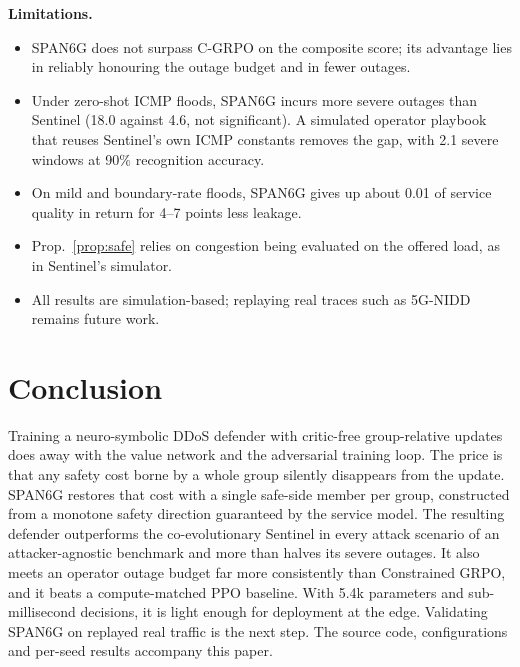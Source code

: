\documentclass[conference]{IEEEtran}
\begin{document}
\textbf{Limitations.}
\begin{itemize}
\item SPAN6G does not surpass C-GRPO on the composite score; its advantage lies in reliably honouring the outage budget and in fewer outages.
\item Under zero-shot ICMP floods, SPAN6G incurs more severe outages than Sentinel (18.0 against 4.6, not significant). A simulated operator playbook that reuses Sentinel's own ICMP constants removes the gap, with 2.1 severe windows at 90\% recognition accuracy.
\item On mild and boundary-rate floods, SPAN6G gives up about 0.01 of service quality in return for 4--7 points less leakage.
\item Prop.~\ref{prop:safe} relies on congestion being evaluated on the offered load, as in Sentinel's simulator.
\item All results are simulation-based; replaying real traces such as 5G-NIDD remains future work.
\end{itemize}

\section{Conclusion}
Training a neuro-symbolic DDoS defender with critic-free group-relative updates does away with the value network and the adversarial training loop. The price is that any safety cost borne by a whole group silently disappears from the update. SPAN6G restores that cost with a single safe-side member per group, constructed from a monotone safety direction guaranteed by the service model. The resulting defender outperforms the co-evolutionary Sentinel in every attack scenario of an attacker-agnostic benchmark and more than halves its severe outages. It also meets an operator outage budget far more consistently than Constrained GRPO, and it beats a compute-matched PPO baseline. With 5.4k parameters and sub-millisecond decisions, it is light enough for deployment at the edge. Validating SPAN6G on replayed real traffic is the next step. The source code, configurations and per-seed results accompany this paper.



\end{document}
